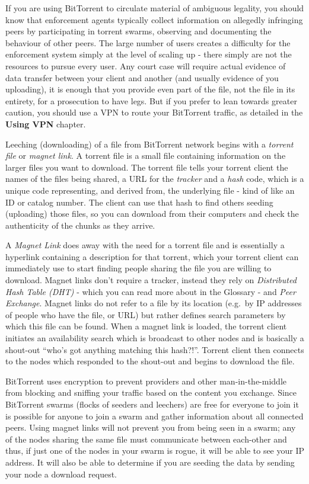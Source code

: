 If you are using BitTorrent to circulate material of ambiguous legality,
you should know that enforcement agents typically collect information on
allegedly infringing peers by participating in torrent swarms, observing
and documenting the behaviour of other peers. The large number of users
creates a difficulty for the enforcement system simply at the level of
scaling up - there simply are not the resources to pursue every user.
Any court case will require actual evidence of data transfer between
your client and another (and usually evidence of you uploading), it is
enough that you provide even part of the file, not the file in its
entirety, for a prosecution to have legs. But if you prefer to lean
towards greater caution, you should use a VPN to route your BitTorrent
traffic, as detailed in the \textbf{Using VPN} chapter.

Leeching (downloading) of a file from BitTorrent network begins with a
\emph{torrent file} or \emph{magnet link}. A torrent file is a small
file containing information on the larger files you want to download.
The torrent file tells your torrent client the names of the files being
shared, a URL for the \emph{tracker} and a \emph{hash} code, which is a
unique code representing, and derived from, the underlying file - kind
of like an ID or catalog number. The client can use that hash to find
others seeding (uploading) those files, so you can download from their
computers and check the authenticity of the chunks as they arrive.

A \emph{Magnet Link} does away with the need for a torrent file and is
essentially a hyperlink containing a description for that torrent, which
your torrent client can immediately use to start finding people sharing
the file you are willing to download. Magnet links don't require a
tracker, instead they rely on \emph{Distributed Hash Table (DHT)} -
which you can read more about in the Glossary - and \emph{Peer
Exchange}. Magnet links do not refer to a file by its location (e.g.~by
IP addresses of people who have the file, or URL) but rather defines
search parameters by which this file can be found. When a magnet link is
loaded, the torrent client initiates an availability search which is
broadcast to other nodes and is basically a shout-out ``who's got
anything matching this hash?!''. Torrent client then connects to the
nodes which responded to the shout-out and begins to download the file.

BitTorrent uses encryption to prevent providers and other
man-in-the-middle from blocking and sniffing your traffic based on the
content you exchange. Since BitTorrent swarms (flocks of seeders and
leechers) are free for everyone to join it is possible for anyone to
join a swarm and gather information about all connected peers. Using
magnet links will not prevent you from being seen in a swarm; any of the
nodes sharing the same file must communicate between each-other and
thus, if just one of the nodes in your swarm is rogue, it will be able
to see your IP address. It will also be able to determine if you are
seeding the data by sending your node a download request.

